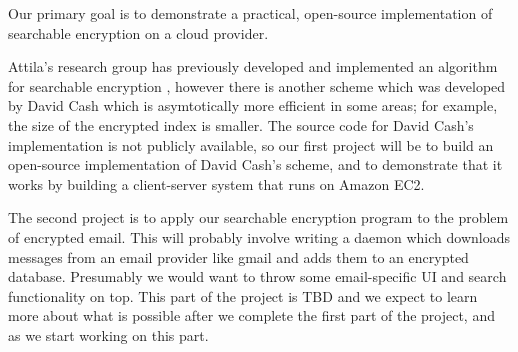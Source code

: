 \documentclass[onecolumn, draftclsnofoot,10pt, compsoc]{IEEEtran}
\begin{document}

Our primary goal is to demonstrate a practical, open-source implementation of searchable encryption on a cloud provider.




Attila's research group has previously developed and implemented an algorithm for searchable encryption \cite{yavuz17},
however there is another scheme which was developed by David Cash which is asymtotically more efficient \cite{cryptoeprint:2014:853}
in some areas; for example, the size of the encrypted index is smaller.
The source code for David Cash's implementation is not publicly available, so
our first project will be to build an open-source implementation of David Cash's scheme,
and to demonstrate that it works by building a client-server system that runs on Amazon EC2.





The second project is to apply our searchable encryption program to the problem of encrypted email.
This will probably involve writing a daemon which downloads messages from an email provider like gmail
and adds them to an encrypted database.
Presumably we would want to throw some email-specific UI and search functionality on top.
This part of the project is TBD and we expect to learn more about what is possible after we complete the first part of the project, and as we start working on this part.
\end{document}
